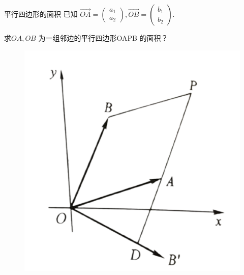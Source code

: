 \documentclass[10pt,punct]{ctexbeamer}
\begin{document}
\begin{frame}{平行四边形的面积}
已知 $\overrightarrow{O A}=\left(\begin{array}{l}a_1 \\ a_2\end{array}\right), \overrightarrow{O B}=\left(\begin{array}{l}b_1 \\ b_2\end{array}\right)$.


求$O A, O B$ 为一组邻边的平行四边形OAPB 的面积？

        \begin{figure}[p]
    \includegraphics[scale=0.6]{det-2.png}
\end{figure}

\end{frame}
\end{document}
